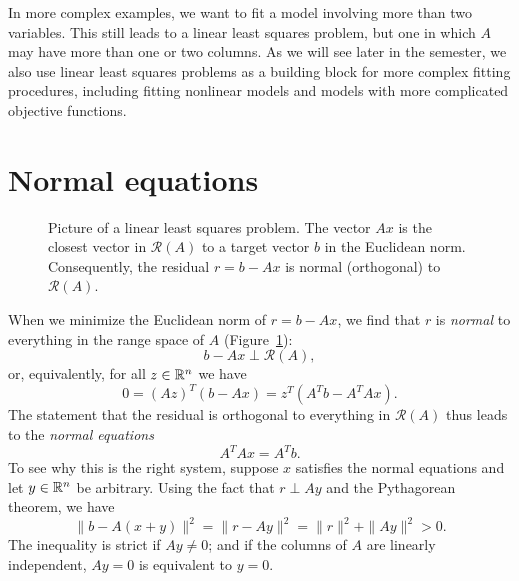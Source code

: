 \documentclass[12pt, leqno]{article}
\begin{document}
In more complex examples, we want to fit a model involving more than
two variables.  This still leads to a linear least squares problem,
but one in which $A$ may have more than one or two columns.  As we
will see later in the semester, we also use linear least squares
problems as a building block for more complex fitting procedures,
including fitting nonlinear models and models with more complicated
objective functions.

\section{Normal equations}

\begin{figure}
  \begin{center}
  \end{center}
  \caption{Picture of a linear least squares problem.  The vector $Ax$
           is the closest vector in $\mathcal{R}(A)$ to a target
           vector $b$ in the Euclidean norm.  Consequently, the
           residual $r = b-Ax$ is normal (orthogonal) to
           $\mathcal{R}(A)$.}
  \label{fig1}
\end{figure}

When we minimize the Euclidean norm of $r = b-Ax$, we find that $r$ is
{\em normal} to everything in the range space of $A$ (Figure~\ref{fig1}):
\[
  b-Ax \perp \mathcal{R}(A),
\]
or, equivalently, for all $z \in \mathbb{R}^n$ we have
\[
  0 = (Az)^T (b-Ax) = z^T(A^T b - A^T A x).
\]
The statement that the residual is orthogonal to everything in
$\mathcal{R}(A)$ thus leads to the {\em normal equations}
\[
  A^T A x = A^T b.
\]
To see why this is the right system, suppose $x$ satisfies the normal
equations and let $y \in \mathbb{R}^{n}$ be arbitrary.  Using the fact that
$r \perp Ay$ and the Pythagorean theorem, we have
\[
  \|b-A(x+y)\|^2 = \|r-Ay\|^2 = \|r\|^2 + \|Ay\|^2 > 0.
\]
The inequality is strict if $Ay \neq 0$; and if the columns of
$A$ are linearly independent, $Ay = 0$ is equivalent to $y = 0$.
\end{document}
